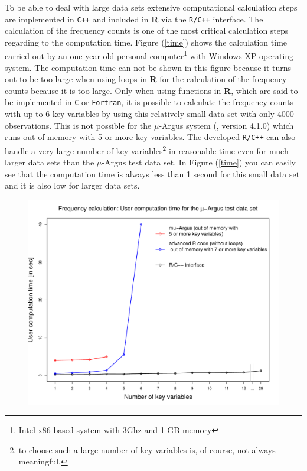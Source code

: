 \documentclass[12pt]{article}
\begin{document}
To be able to deal with large data sets extensive computational calculation steps are implemented in {\tt C++} and included in {\bf R} via the {\tt R/C++} interface.
The calculation of the frequency counts is one of the most critical calculation steps regarding to the computation time. Figure (\ref{time}) shows the calculation time carried out by an one year old personal computer\footnote{Intel x86 based system with 3Ghz and 1 GB memory} with Windows XP operating system. The computation time can not be shown in this figure because it turns out to be too large when using loops in {\bf R} for the calculation of the frequency counts because it is too large. Only when using functions in {\bf R}, which are said to be implemented in {\tt C} or {\tt Fortran}, it is possible to calculate the frequency counts with up to 6 key variables by using this relatively small data set with only 4000 observations. This is not possible for the $\mu$-Argus system (\cite{Hundepool06mu}, version 4.1.0) which runs out of memory with 5 or more key variables. The developed {\tt R/C++} can also handle a very large number of key variables\footnote{to choose such a large number of key variables is, of course, not always meaningful.} in reasonable time even for much larger data sets than the $\mu$-Argus test data set. In Figure (\ref{time}) you can easily see that the computation time is always less than 1 second for this small data set and it is also low for larger data sets. 

\begin{figure}
\begin{center}
\includegraphics{sdcMicroPaper-001}
\end{center}
\end{figure} 
\end{document}
